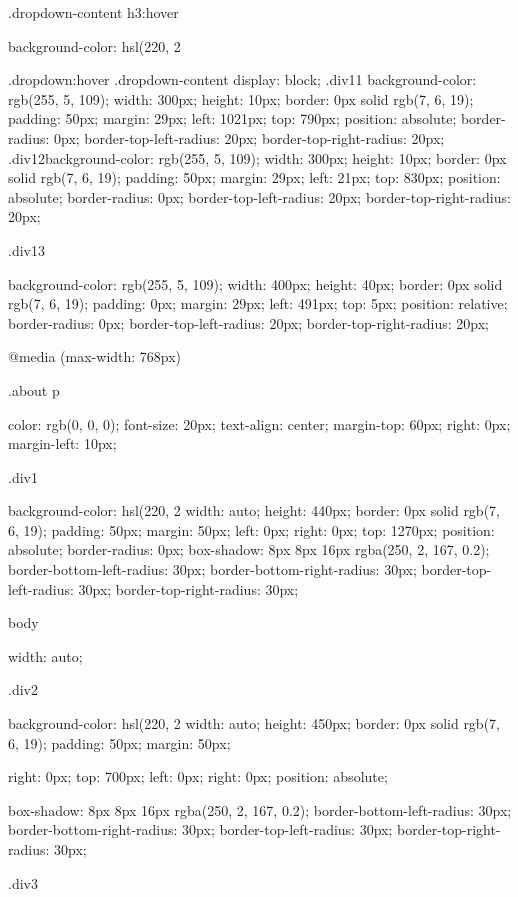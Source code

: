 .dropdown-content h3:hover {background-color: hsl(220, 2%

.dropdown:hover .dropdown-content {
  display: block;
}
.div11 {background-color: rgb(255, 5, 109);
width: 300px;
height: 10px;
border: 0px solid rgb(7, 6, 19);
padding: 50px;
margin: 29px;
left: 1021px;
top: 790px;
position: absolute;
border-radius: 0px;
border-top-left-radius: 20px;
border-top-right-radius: 20px;
}
.div12{background-color: rgb(255, 5, 109);
width: 300px;
height: 10px;
border: 0px solid rgb(7, 6, 19);
padding: 50px;
margin: 29px;
left: 21px;
top: 830px;
position: absolute;
border-radius: 0px;
border-top-left-radius: 20px;
border-top-right-radius: 20px;}

.div13 {background-color: rgb(255, 5, 109);
  width: 400px;
height: 40px;
border: 0px solid rgb(7, 6, 19);
padding: 0px;
margin: 29px;
left: 491px;
top: 5px;
position: relative;
border-radius: 0px;
border-top-left-radius: 20px;
border-top-right-radius: 20px;

}

@media (max-width: 768px){
  

      .about p{

color: rgb(0, 0, 0);
font-size: 20px;
text-align: center;
margin-top: 60px;
right: 0px;
margin-left: 10px;

}

.div1{

background-color: hsl(220, 2%
width: auto;
height: 440px;
border: 0px solid rgb(7, 6, 19);
padding: 50px;
margin: 50px;
left: 0px;
right: 0px;
top: 1270px;
position: absolute;
border-radius: 0px;
box-shadow: 8px 8px 16px rgba(250, 2, 167, 0.2);
border-bottom-left-radius: 30px;
border-bottom-right-radius: 30px;
border-top-left-radius: 30px;
border-top-right-radius: 30px;


}


body{

width: auto;

}
.div2{
  

  background-color: hsl(220, 2%
  width: auto;
  height: 450px;
border: 0px solid rgb(7, 6, 19);
padding: 50px;
margin: 50px;

right: 0px;
top: 700px;
left: 0px;
right: 0px;
position: absolute;

box-shadow: 8px 8px 16px rgba(250, 2, 167, 0.2);
border-bottom-left-radius: 30px;
border-bottom-right-radius: 30px;
border-top-left-radius: 30px;
border-top-right-radius: 30px;


}
.div3{
  

}}}
